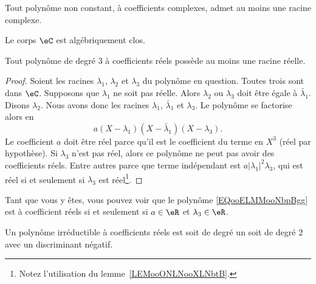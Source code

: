 \begin{theorem}     \label{THOooIRJYooBiHRyW}
    Tout polynôme non constant, à coefficients complexes, admet au moins une racine complexe.
\end{theorem}

\begin{corollary}
    Le corps $\eC$ est algébriquement clos.
\end{corollary}

\begin{corollary}       \label{CORooKKNWooWEQukb}
    Tout polynôme de degré \( 3\) à coefficients réels possède au moins une racine réelle.
\end{corollary}

\begin{proof}
    Soient les racines \( \lambda_1\), \( \lambda_2\) et \( \lambda_3\) du polynôme en question. Toutes trois sont dans \( \eC\). Supposons que \( \lambda_1\) ne soit pas réelle. Alors \( \lambda_2\) ou \( \lambda_3\) doit être égale à \( \bar\lambda_1\). Disons \( \lambda_2\). Nous avons donc les racines \( \lambda_1\), \( \bar\lambda_1\) et \( \lambda_3\). Le polynôme se factorise alors en
    \begin{equation}        \label{EQooELMMooNbpBgg}
        a(X-\lambda_1)(X-\bar\lambda_1)(X-\lambda_3).
    \end{equation}
    Le coefficient \( a\) doit être réel parce qu'il est le coefficient du terme en \( X^3\) (réel par hypothèse). Si \( \lambda_3\) n'est pas réel, alors ce polynôme ne peut pas avoir des coefficients réels. Entre autres parce que terme indépendant est \( a| \lambda_1 |^2\lambda_3\), qui est réel si et seulement si \( \lambda_3\) est réel\footnote{Notez l'utilisation du lemme~\ref{LEMooONLNooXLNbtB}.}.
\end{proof}
Tant que vous y êtes, vous pouvez voir que le polynôme \eqref{EQooELMMooNbpBgg} est à coefficient réels si et seulement si \( a\in \eR\) et \( \lambda_3\in \eR\).

\begin{proposition}
    Un polynôme irréductible à coefficients réels est soit de degré un soit de degré \( 2\) avec un discriminant négatif.
\end{proposition}


